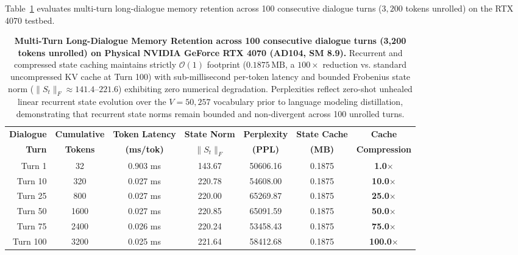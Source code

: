 Table~\ref{tab:multiturn_dialogue} evaluates multi-turn long-dialogue memory retention across 100 consecutive dialogue turns ($3{,}200$ tokens unrolled) on the RTX 4070 testbed.

\begin{table}[t]
\centering
\small
\caption[Multi-Turn Dialogue Memory Retention Dynamics]{\textbf{Multi-Turn Long-Dialogue Memory Retention across 100 consecutive dialogue turns (3,200 tokens unrolled) on Physical NVIDIA GeForce RTX 4070 (AD104, SM 8.9).} Recurrent and compressed state caching maintains strictly $\mathcal{O}(1)$ footprint ($0.1875\,\text{MB}$, a $100\times$ reduction vs. standard uncompressed KV cache at Turn 100) with sub-millisecond per-token latency and bounded Frobenius state norm ($\|S_t\|_F \approx 141.4\text{--}221.6$) exhibiting zero numerical degradation. Perplexities reflect zero-shot unhealed linear recurrent state evolution over the $V=50{,}257$ vocabulary prior to language modeling distillation, demonstrating that recurrent state norms remain bounded and non-divergent across 100 unrolled turns.}
\label{tab:multiturn_dialogue}
\setlength{\tabcolsep}{5pt}
\renewcommand{\arraystretch}{1.15}
\begin{tabular}{rcccccc}
\toprule
\textbf{Dialogue} & \textbf{Cumulative} & \textbf{Token Latency} & \textbf{State Norm} & \textbf{Perplexity} & \textbf{State Cache} & \textbf{Cache} \\
\textbf{Turn} & \textbf{Tokens} & \textbf{(ms/tok)} & \textbf{$\|S_t\|_F$} & \textbf{(PPL)} & \textbf{(MB)} & \textbf{Compression} \\
\midrule
Turn 1   & 32   & 0.903 ms & 143.67 & 50606.16 & 0.1875 & \textbf{1.0}$\times$ \\
Turn 10  & 320  & 0.027 ms & 220.78 & 54608.00 & 0.1875 & \textbf{10.0}$\times$ \\
Turn 25  & 800  & 0.027 ms & 220.00 & 65269.87 & 0.1875 & \textbf{25.0}$\times$ \\
Turn 50  & 1600 & 0.027 ms & 220.85 & 65091.59 & 0.1875 & \textbf{50.0}$\times$ \\
Turn 75  & 2400 & 0.026 ms & 220.24 & 53458.43 & 0.1875 & \textbf{75.0}$\times$ \\
Turn 100 & 3200 & 0.025 ms & 221.64 & 58412.68 & 0.1875 & \textbf{100.0}$\times$ \\
\bottomrule
\end{tabular}
\end{table}

